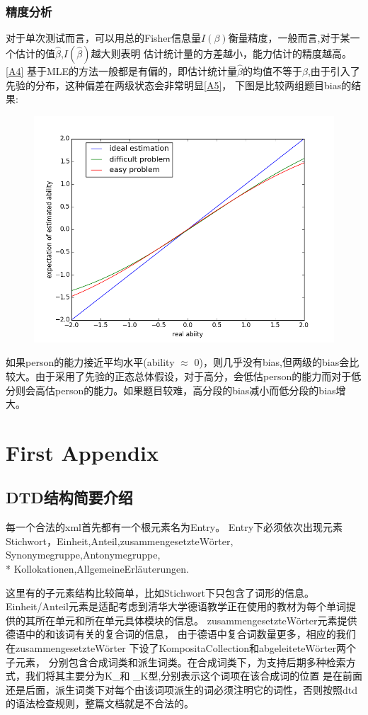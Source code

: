 \documentclass[12pt]{article}
\begin{document}
\subsubsection{精度分析}
对于单次测试而言，可以用总的Fisher信息量$I(\beta)$衡量精度，一般而言,对于某一个估计的值$\hat{\beta}$,$I(\hat{\beta})$越大则表明
估计统计量的方差越小，能力估计的精度越高。\ref{A4}
基于MLE的方法一般都是有偏的，即估计统计量$\hat{\beta}$的均值不等于$\beta$,由于引入了先验的分布，这种偏差在两级状态会非常明显\ref{A5}，
下图是比较两组题目bias的结果:
\begin{figure}[!ht]
\includegraphics[width=\linewidth]{bias.png}
\end{figure}
如果person的能力接近平均水平(ability $\approx$ 0)，则几乎没有bias,但两级的bias会比较大。由于采用了先验的正态总体假设，对于高分，会低估person的能力而对于低分则会高估person的能力。如果题目较难，高分段的bias减小而低分段的bias增大。

\appendix
\section{First Appendix}
\subsection{DTD结构简要介绍}\label{A_F_1}
每一个合法的xml首先都有一个根元素名为Entry。
Entry下必须依次出现元素Stichwort，Einheit,Anteil,zusammengesetzteWörter,
Synonymegruppe,Antonymegruppe,\\*
Kollokationen,AllgemeineErläuterungen.

这里有的子元素结构比较简单，比如Stichwort下只包含了词形的信息。
Einheit/Anteil元素是适配考虑到清华大学德语教学正在使用的教材为每个单词提供的其所在单元和所在单元具体模块的信息。
zusammengesetzteWörter元素提供德语中的和该词有关的复合词的信息，
由于德语中复合词数量更多，相应的我们在zusammengesetzteWörter
下设了KompositaCollection和abgeleiteteWörter两个子元素，
分别包含合成词类和派生词类。在合成词类下，为支持后期多种检索方式，我们将其主要分为K\_和 \_K型,分别表示这个词项在该合成词的位置
是在前面还是后面，派生词类下对每个由该词项派生的词必须注明它的词性，否则按照dtd的语法检查规则，整篇文档就是不合法的。
\end{document}
